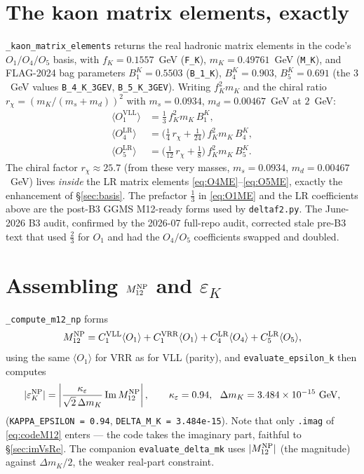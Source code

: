 \documentclass[11pt]{article}
\newcommand{\epsK}{\varepsilon_K}
\newcommand{\eps}{\varepsilon}
\newcommand{\Mtwelve}{M_{12}}
\newcommand{\dmk}{\Delta m_K}
\newcommand{\code}[1]{\texttt{#1}}
\theoremstyle{definition}
\begin{document}
\section{The kaon matrix elements, exactly}
\label{sec:codeME}

\code{\_kaon\_matrix\_elements} returns the real hadronic matrix elements in the
code's $O_1/O_4/O_5$ basis, with $f_K=0.1557$~GeV (\code{F\_K}),
$m_K=0.49761$~GeV (\code{M\_K}), and FLAG-2024 bag parameters $B_1^K=0.5503$
(\code{B\_1\_K}), $B_4^K=0.903$, $B_5^K=0.691$ (the $3$~GeV values
\code{B\_4\_K\_3GEV}, \code{B\_5\_K\_3GEV}). Writing $f_K^2 m_K$ and the chiral
ratio $r_\chi=(m_K/(m_s+m_d))^2$ with $m_s=0.0934$, $m_d=0.00467$~GeV at $2$~GeV:
\begin{align}
\langle O_1^{\mathrm{VLL}}\rangle &= \tfrac{1}{3}\,f_K^2 m_K\, B_1^K,
\label{eq:O1ME}\\
\langle O_4^{\mathrm{LR}}\rangle &= \big(\tfrac14\,r_\chi + \tfrac{1}{24}\big)\,f_K^2 m_K\, B_4^K,
\label{eq:O4ME}\\
\langle O_5^{\mathrm{LR}}\rangle &= \big(\tfrac{1}{12}\,r_\chi + \tfrac18\big)\,f_K^2 m_K\, B_5^K.
\label{eq:O5ME}
\end{align}
The chiral factor $r_\chi\approx25.7$ (from these very masses, $m_s=0.0934$,
$m_d=0.00467$~GeV) lives \emph{inside} the LR matrix elements
\eqref{eq:O4ME}--\eqref{eq:O5ME}, exactly the enhancement of
\S\ref{sec:basis}. The prefactor $\tfrac{1}{3}$ in \eqref{eq:O1ME} and the LR
coefficients above are the post-B3 GGMS M12-ready forms used by \code{deltaf2.py}.
The June-2026 B3 audit, confirmed by the 2026-07 full-repo audit, corrected stale
pre-B3 text that used $\tfrac23$ for $O_1$ and had the $O_4/O_5$ coefficients
swapped and doubled.

\section{Assembling $M_{12}^{\rm NP}$ and $\varepsilon_K$}
\label{sec:codeassemble}

\code{\_compute\_m12\_np} forms
\begin{equation}
\Mtwelve^{\rm NP} = C_1^{\mathrm{VLL}}\langle O_1\rangle + C_1^{\mathrm{VRR}}\langle O_1\rangle
+ C_4^{\mathrm{LR}}\langle O_4\rangle + C_5^{\mathrm{LR}}\langle O_5\rangle,
\label{eq:codeM12}
\end{equation}
using the same $\langle O_1\rangle$ for VRR as for VLL (parity), and
\code{evaluate\_epsilon\_k} then computes
\begin{equation}
|\epsK^{\rm NP}| = \left|\frac{\kappa_\eps}{\sqrt2\,\dmk}\,\mathrm{Im}\,\Mtwelve^{\rm NP}\right|,
\qquad \kappa_\eps = 0.94,\ \ \dmk = 3.484\times10^{-15}~\text{GeV},
\label{eq:codeeps}
\end{equation}
(\code{KAPPA\_EPSILON = 0.94}, \code{DELTA\_M\_K = 3.484e-15}). Note that only
\code{.imag} of \eqref{eq:codeM12} enters --- the code takes the imaginary part,
faithful to \S\ref{sec:imVsRe}. The companion \code{evaluate\_delta\_mk} uses
$|\Mtwelve^{\rm NP}|$ (the magnitude) against $\dmk/2$, the weaker real-part
constraint.
\end{document}
